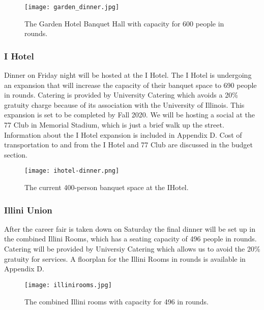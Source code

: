\begin{figure}[H]
    \centering
    \texttt{[image: garden\_dinner.jpg]}
    \caption{The Garden Hotel Banquet Hall with capacity for 600 people in rounds.}
\end{figure}

\subsubsection{I Hotel}
Dinner on Friday night will be hosted at the I Hotel. The I Hotel is undergoing an expansion that will increase the capacity of their banquet space to 690 people in rounds. Catering is provided by University Catering which avoids a 20\% gratuity charge because of its association with the University of Illinois. This expansion is set to be completed by Fall 2020. We will be hosting a social at the 77 Club in Memorial Stadium, which is just a brief walk up the street. Information about the I Hotel expansion is included in Appendix D. Cost of transportation to and from the I Hotel and 77 Club are discussed in the budget section. 

\begin{figure}[H]
    \centering
    \texttt{[image: ihotel-dinner.png]}
    \caption{The current 400-person banquet space at the IHotel.}
\end{figure}

\subsubsection{Illini Union}
After the career fair is taken down on Saturday the final dinner will be set up in the combined Illini Rooms, which has a seating capacity of 496 people in rounds. Catering will be provided by Universiy Catering which allows us to avoid the 20\% gratuity for services. A floorplan for the Illini Rooms in rounds is available in Appendix D.\\

\begin{figure}[H]
    \centering
    \texttt{[image: illinirooms.jpg]}
    \caption{The combined Illini rooms with capacity for 496 in rounds.}
\end{figure}


